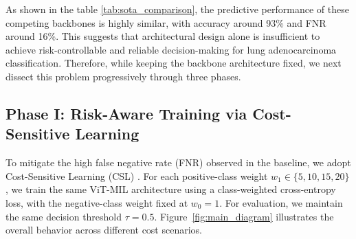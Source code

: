\documentclass[journal,twoside,web]{ieeecolor}
\begin{document}
\begin{table}[htbp]
    \centering
    \caption{Performance comparison of baseline and other competing models.}\label{tab:sota_comparison}
\end{table}

As shown in the table \ref{tab:sota_comparison}, the predictive performance of these competing backbones is highly similar, with accuracy around 93\% and FNR around 16\%. This suggests that architectural design alone is insufficient to achieve risk-controllable and reliable decision-making for lung adenocarcinoma classification. Therefore, while keeping the backbone architecture fixed, we next dissect this problem progressively through three phases.



\subsection{Phase I: Risk-Aware Training via Cost-Sensitive Learning}\label{sec:phase1_results}

To mitigate the high false negative rate (FNR) observed in the baseline, we adopt Cost-Sensitive Learning (CSL) \cite{he2009learning,elkan2001foundations}. For each positive-class weight $w_{1} \in \{5,10,15,20\}$, we train the same ViT-MIL architecture using a class-weighted cross-entropy loss, with the negative-class weight fixed at $w_{0}=1$. For evaluation, we maintain the same decision threshold $\tau = 0.5$. Figure~\ref{fig:main_diagram} illustrates the overall behavior across different cost scenarios.
\end{document}
